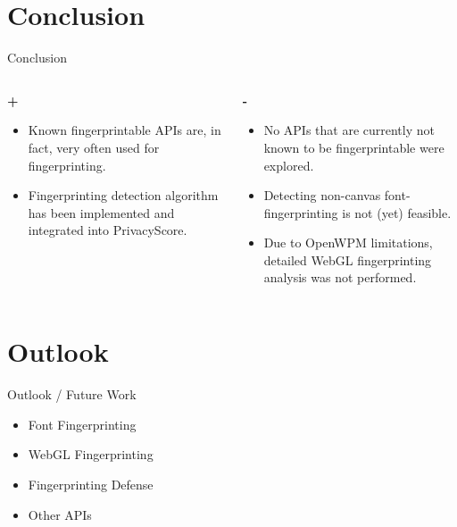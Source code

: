 \documentclass[t]{beamer}
\begin{document}
\section{Conclusion}
\begin{frame}{Conclusion}
    \begin{columns}[T]
        \begin{column}{0.4\textwidth}
            \textbf{+}
            \begin{itemize}
                \pause
                \item Known fingerprintable APIs are, in fact, very often used for fingerprinting.
                \pause
                \item Fingerprinting detection algorithm has been implemented and integrated into PrivacyScore.
            \end{itemize}
        \end{column}
        \begin{column}{0.6\textwidth}
            \textbf{-}
            \begin{itemize}
                \pause
                \item No APIs that are currently not known to be fingerprintable were explored.
                \pause
                \item Detecting non-canvas font-fingerprinting is not (yet) feasible.
                \pause
                \item Due to OpenWPM limitations, detailed WebGL fingerprinting analysis was not performed.
            \end{itemize}
        \end{column}
    \end{columns}
\end{frame}

\section{Outlook}
\begin{frame}{Outlook / Future Work}
    \begin{itemize}
        \pause
        \item Font Fingerprinting
        \pause
        \item WebGL Fingerprinting
        \pause
        \item Fingerprinting Defense
        \pause
        \item Other APIs
    \end{itemize}
\end{frame}
\end{document}
